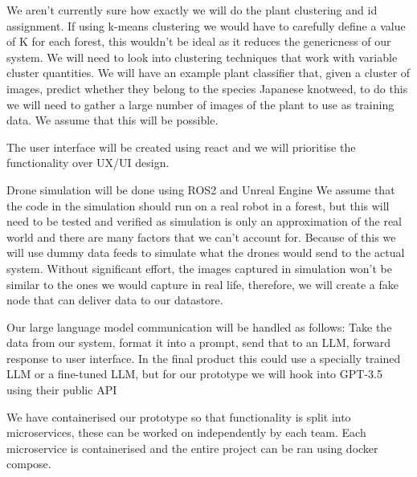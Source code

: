 \documentclass{article}
\begin{document}
We aren't currently sure how exactly we will do the plant clustering and id assignment.
If using k-means clustering we would have to carefully define a value of K for each forest, this wouldn't be ideal as it reduces the genericness of our system.
We will need to look into clustering techniques that work with variable cluster quantities.
We will have an example plant classifier that, given a cluster of images, predict whether they belong to the species Japanese knotweed, to do this we will need to gather a large number of images of the plant to use as training data. We assume that this will be possible. %

The user interface will be created using react and we will prioritise the functionality over UX/UI design. 

Drone simulation will be done using ROS2 and Unreal Engine %
We assume that the code in the simulation should run on a real robot in a forest, but this will need to be tested and verified as simulation is only an approximation of the real world and there are many factors that we can't account for.
Because of this we will use dummy data feeds to simulate what the drones would send to the actual system.
Without significant effort, the images captured in simulation won't be similar to the ones we would capture in real life, therefore, we will create a fake node that can deliver data to our datastore.

Our large language model communication will be handled as follows: Take the data from our system, format it into a prompt, send that to an LLM, forward response to user interface.
In the final product this could use a specially trained LLM or a fine-tuned LLM, but for our prototype we will hook into GPT-3.5 using their public API %

We have containerised our prototype so that functionality is split into microservices, these can be worked on independently by each team.
Each microservice is containerised and the entire project can be ran using docker compose.

\end{document}

